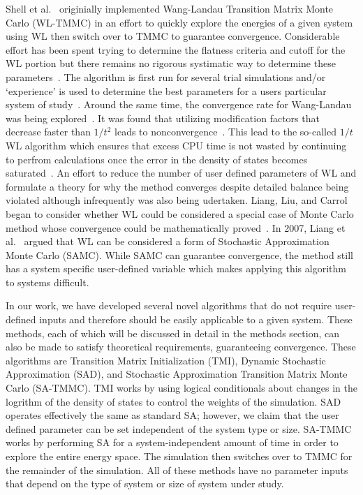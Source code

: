 \documentclass[letterpaper,twocolumn,amsmath,amssymb,pre,aps,10pt]{revtex4-1}
\begin{document}
Shell et al.~\cite{shell2003improved, shell2004flat} originially
implemented Wang-Landau Transition Matrix Monte Carlo (WL-TMMC) in an
effort to quickly explore the energies of a given system using WL then
switch over to TMMC to guarantee convergence. Considerable effort has
been spent trying to determine the flatness criteria and cutoff for the
WL portion but there remains no rigorous systimatic way to determine
these parameters~\cite{rane2013monte}.  The algorithm is first run for
several trial simulations and/or `experience' is used to determine the
best parameters for a users particular system of
study~\cite{siderius2013use}.  Around the same time, the convergence
rate for Wang-Landau was being explored~\cite{zhou2005understanding}.
It was found that utilizing modification factors that decrease faster
than $1/t^2$ leads to nonconvergence~\cite{belardinelli2007fast}.  This
lead to the so-called $1/t$ WL algorithm which ensures that excess CPU
time is not wasted by continuing to perfrom calculations once the error
in the density of states becomes
saturated~\cite{belardinelli2008analysis}. An effort to reduce the
number of user defined parameters of WL and formulate a theory for why
the method converges despite detailed balance being violated although
infrequently was also being udertaken.  Liang, Liu, and Carrol began to
consider whether WL could be considered a special case of Monte Carlo
method whose convergence could be mathematically
proved~\cite{liang2006theory, liang2007stochastic}. In 2007, Liang et
al.~\cite{liang2007stochastic} argued that WL can be considered a form
of Stochastic Approximation Monte Carlo (SAMC).  While SAMC can
guarantee convergence, the method still has a system specific
user-defined variable which makes applying this algorithm to systems
difficult.

In our work, we have developed several novel algorithms that do not
require user-defined inputs and therefore should be easily applicable
to a given system.  These methods, each of which will be discussed in
detail in the methods section, can also be made to satisfy theoretical
requirements, guaranteeing convergence. These algorithms are Transition
Matrix Initialization (TMI), Dynamic Stochastic Approximation (SAD),
and Stochastic Approximation Transition Matrix Monte Carlo (SA-TMMC).
TMI works by using logical conditionals about changes in the logrithm
of the density of states to control the weights of the simulation.  SAD
operates effectively the same as standard SA; however, we claim that
the user defined parameter can be set independent of the system type or
size.  SA-TMMC works by performing SA for a system-independent amount
of time in order to explore the entire energy space.  The simulation
then switches over to TMMC for the remainder of the simulation.  All of
these methods have no parameter inputs that depend on the type of
system or size of system under study.
\end{document}
